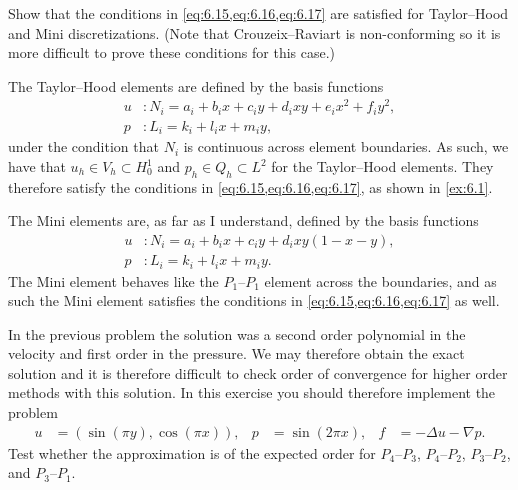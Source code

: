 \begin{exercise}{6.2}
    Show that the conditions in \cref{eq:6.15,eq:6.16,eq:6.17} are satisfied for Taylor--Hood and Mini discretizations. %
    (Note that Crouzeix--Raviart is non-conforming so it is more difficult to prove these conditions for this case.) %
\end{exercise}

\begin{solution}{6.2}
    The Taylor--Hood elements are defined by the basis functions %
    \begin{equation}
        \begin{split}
            u &: N_i = a_i + b_i x + c_i y + d_i x y + e_i x^2 + f_i y^2, \\
            p &: L_i = k_i + l_i x + m_i y,
        \end{split}
    \end{equation}
    under the condition that $N_i$ is continuous across element boundaries.
    As such, we have that $u_h \in V_h \subset H^1_0$ and $p_h \in Q_h \subset L^2$ for the Taylor--Hood elements. %
    They therefore satisfy the conditions in \cref{eq:6.15,eq:6.16,eq:6.17}, as shown in \cref{ex:6.1}.

    The Mini elements are, as far as I understand, defined by the basis functions
    \begin{equation}
        \begin{split}
            u &: N_i = a_i + b_i x + c_i y + d_i xy(1 - x - y), \\
            p &: L_i = k_i + l_i x + m_i y.
        \end{split}
    \end{equation}
    The Mini element behaves like the $P_1$--$P_1$ element across the boundaries, and as such the Mini element satisfies the conditions in \cref{eq:6.15,eq:6.16,eq:6.17} as well.
\end{solution}

\begin{exercise}{6.6}
    In the previous problem the solution was a second order polynomial in the velocity and first order in the pressure.
    We may therefore obtain the exact solution and it is therefore difficult to check order of convergence for higher order methods with this solution.
    In this exercise you should therefore implement the problem
    \begin{align*}
        u &= (\sin(\pi y), \cos(\pi x)),
        & p &= \sin(2 \pi x),
        & f &= -\Delta u - \nabla p.
    \end{align*}
    Test whether the approximation is of the expected order for $P_4$--$P_3$, $P_4$--$P_2$, $P_3$--$P_2$, and $P_3$--$P_1$.
\end{exercise}

